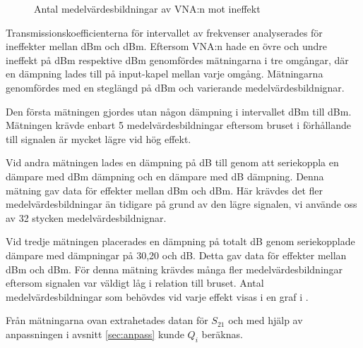 \documentclass[main.tex]{subfiles}
\begin{document}
\begin{figure}
    \centering
    \setlength{}
    \setlength\figureheight{7em}
    
    \caption{Antal medelvärdesbildningar av VNA:n mot ineffekt}
    \label{fig:medel}
\end{figure}

Transmissionskoefficienterna för intervallet av frekvenser analyserades för ineffekter mellan \unit[8]{dBm} och \unit[-83]{dBm}. Eftersom VNA:n hade en övre och undre ineffekt på \unit[8]{dBm} respektive \unit[-27]{dBm} genomfördes mätningarna i tre omgångar, där en dämpning lades till på input-kapel mellan varje omgång. Mätningarna genomfördes med en steglängd på \unit[2,5]{dBm} och varierande medelvärdesbildnignar. 

Den första mätningen gjordes utan någon dämpning i intervallet \unit[8]{dBm} till \unit[-27]{dBm}. Mätningen krävde enbart 5 medelvärdesbildningar eftersom bruset i förhållande till signalen är mycket lägre vid hög effekt.

Vid andra mätningen lades en dämpning på \unit[30]{dB} till genom att seriekoppla en dämpare med \unit[20]{dBm} dämpning och en dämpare med \unit[10]{dB} dämpning. Denna mätning gav data för effekter mellan \unit[-22]{dBm} och \unit[-52]{dBm}. Här krävdes det fler medelvärdesbildningar än tidigare på grund av den lägre signalen, vi använde oss av 32 stycken medelvärdesbildnignar. 

Vid tredje mätningen placerades en dämpning på totalt \unit[56]{dB} genom seriekopplade dämpare med dämpningar på 30,20 och \unit[6]{dB}. Detta gav data för effekter mellan \unit[-44]{dBm} och \unit[-83]{dBm}. För denna mätning krävdes många fler medelvärdesbildningar eftersom signalen var väldigt låg i relation till  bruset. Antal medelvärdesbildningar som behövdes vid varje effekt visas i en graf i .

Från mätningarna ovan extrahetades datan för $S_{21}$ och med hjälp av anpassningen i avsnitt \ref{sec:anpass} kunde $Q_i$ beräknas.

\end{document}
